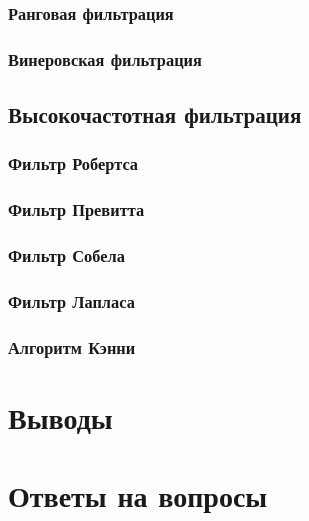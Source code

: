 \subsubsection{Ранговая фильтрация}
\subsubsection{Винеровская фильтрация}

\subsection{Высокочастотная фильтрация}
\subsubsection{Фильтр Робертса}
\newpage
\subsubsection{Фильтр Превитта}
\subsubsection{Фильтр Собела}
\subsubsection{Фильтр Лапласа}
\subsubsection{Алгоритм Кэнни}
\section{Выводы}

\section{Ответы на вопросы}

\setcounter{question}{0}

\newcommand{\question}[1]{\item[Q\refstepcounter{question}\thequestion.] #1}
\newcommand{\answer}[1]{\item[A\thequestion.] #1}

